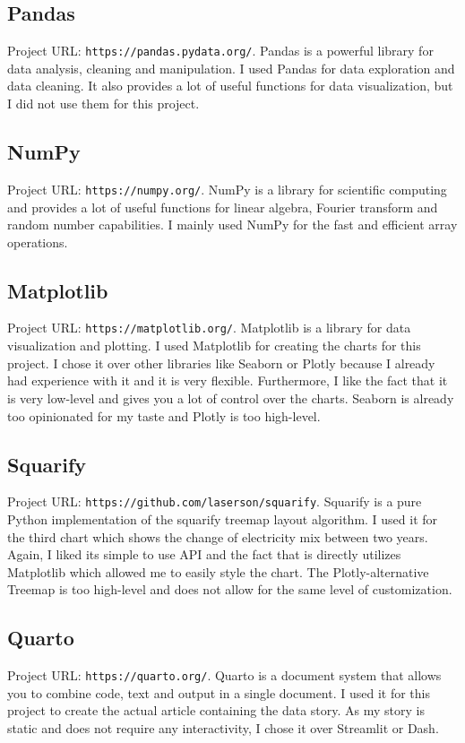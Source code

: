 \documentclass{article}
\begin{document}
\subsection{Pandas}
Project URL: \texttt{https://pandas.pydata.org/}.\newline
Pandas is a powerful library for data analysis, cleaning and manipulation.
I used Pandas for data exploration and data cleaning.
It also provides a lot of useful functions for data visualization, but I did not use them for this project.

\subsection{NumPy}
Project URL: \texttt{https://numpy.org/}.\newline
NumPy is a library for scientific computing and provides a lot of useful functions for linear algebra, Fourier transform and random number capabilities.
I mainly used NumPy for the fast and efficient array operations.

\subsection{Matplotlib}
Project URL: \texttt{https://matplotlib.org/}.\newline
Matplotlib is a library for data visualization and plotting.
I used Matplotlib for creating the charts for this project.
I chose it over other libraries like Seaborn or Plotly because I already had experience with it and it is very flexible.
Furthermore, I like the fact that it is very low-level and gives you a lot of control over the charts.
Seaborn is already too opinionated for my taste and Plotly is too high-level.

\subsection{Squarify}
Project URL: \texttt{https://github.com/laserson/squarify}.\newline
Squarify is a pure Python implementation of the squarify treemap layout algorithm.
I used it for the third chart which shows the change of electricity mix between two years.
Again, I liked its simple to use API and the fact that is directly utilizes Matplotlib which allowed me to easily style the chart.
The Plotly-alternative Treemap is too high-level and does not allow for the same level of customization.

\subsection{Quarto}
Project URL: \texttt{https://quarto.org/}.\newline
Quarto is a document system that allows you to combine code, text and output in a single document.
I used it for this project to create the actual article containing the data story.
As my story is static and does not require any interactivity, I chose it over Streamlit or Dash.
\end{document}
